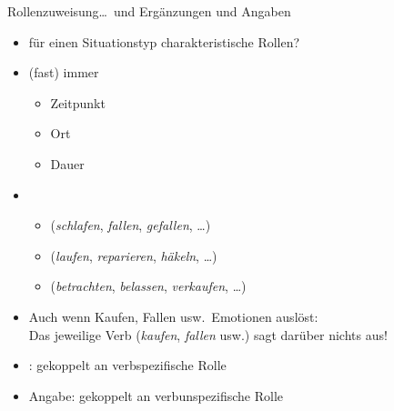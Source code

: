 \begin{frame}
  {Rollenzuweisung\ldots\ und Ergänzungen und Angaben}
  \pause
  \begin{itemize}[<+->]
    \item für einen Situationstyp charakteristische Rollen?
      \Viertelzeile
    \item (fast) \alert{immer} \zB
      \begin{itemize}[<+->]
        \item \alert{Zeitpunkt}
        \item \alert{Ort}
        \item \alert{Dauer}
      \end{itemize}
      \Viertelzeile
    \item {} \zB
      \begin{itemize}[<+->]
        \item {} (\textit{schlafen}, \textit{fallen}, \textit{gefallen}, \ldots)
        \item {} (\textit{laufen}, \textit{reparieren}, \textit{häkeln}, \ldots)
        \item {} (\textit{betrachten}, \textit{belassen}, \textit{verkaufen}, \ldots)
      \end{itemize}
      \Viertelzeile
    \item Auch wenn Kaufen, Fallen usw.\ Emotionen auslöst:\\
      \alert{Das jeweilige Verb (\textit{kaufen}, \textit{fallen} usw.) sagt darüber nichts aus!}
      \Viertelzeile
    \item {}: gekoppelt an \alert{verbspezifische} Rolle 
    \item \alert{Angabe}: gekoppelt an \alert{verbunspezifische} Rolle
  \end{itemize}
\end{frame}


